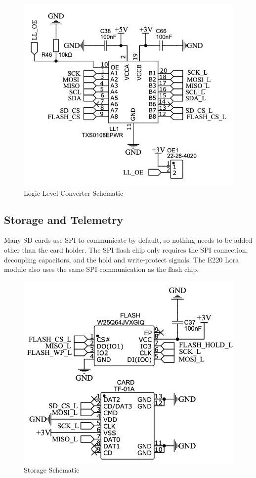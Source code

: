 \documentclass[conf]{new-aiaa}
\begin{document}
\begin{figure}[H]
    \centering
    \includegraphics[scale=0.35]{ll_schematic.png}
    \caption{Logic Level Converter Schematic}
    \label{fig:ll_schematic}
\end{figure}

\subsection{Storage and Telemetry}

Many SD cards use SPI to communicate by default, so nothing needs to be added other than the card holder. The SPI flash chip only requires the SPI connection, decoupling capacitors, and the hold and write-protect signals\cite{w25q64}. The E220 Lora module also uses the same SPI communication as the flash chip\cite{e220}.

\begin{figure}[H]
    \centering
    \includegraphics[scale=0.35]{storage_schematic.png}
    \caption{Storage Schematic}
    \label{fig:storage_schematic}
\end{figure}
\end{document}
